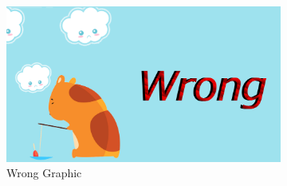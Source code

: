 \documentclass[a4paper]{article}
\begin{document}
\begin{figure}[h!]
\begin{subfigure}[b]{0.3\linewidth}
    \includegraphics[width=\linewidth]{png-creation/wrong-graphic.png}
    \caption{Wrong Graphic}
    \label{fig:wrong_graphic}
  \end{subfigure}
  \caption{}
\end{figure}
\end{document}
